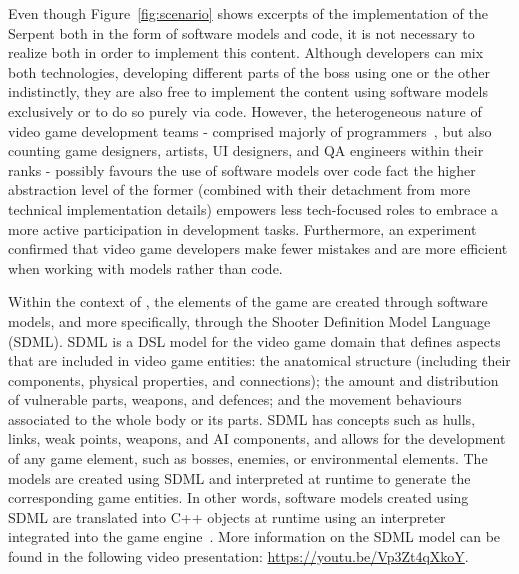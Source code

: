 Even though Figure~\ref{fig:scenario} shows excerpts of the implementation of the Serpent both in the form of software models and code, it is not necessary to realize both in order to implement this content. Although developers can mix both technologies, developing different parts of the boss using one or the other indistinctly, they are also free to implement the content using software models exclusively or to do so purely via code. However, the heterogeneous nature of video game development teams - comprised majorly of programmers~\cite{devNation}, but also counting game designers, artists, UI designers, and QA engineers within their ranks - possibly favours the use of software models over code fact the higher abstraction level of the former (combined with their detachment from more technical implementation details) empowers less tech-focused roles to embrace a more active participation in development tasks. Furthermore, an experiment~\cite{domingo2020evaluating} confirmed that video game developers make fewer mistakes and are more efficient when working with models rather than code.

Within the context of \CaseStudy{}, the elements of the game are created through software models, and more specifically, through the Shooter Definition Model Language (SDML). SDML is a DSL model for the video game domain that defines aspects that are included in video game entities: the anatomical structure (including their components, physical properties, and connections); the amount and distribution of vulnerable parts, weapons, and defences; and the movement behaviours associated to the whole body or its parts. SDML has concepts such as hulls, links, weak points, weapons, and AI components, and allows for the development of any game element, such as bosses, enemies, or environmental elements. The models are created using SDML and interpreted at runtime to generate the corresponding game entities. In other words, software models created using SDML are translated into C++ objects at runtime using an interpreter integrated into the game engine~\cite{blasco2021evolutionary}. More information on the SDML model can be found in the following video presentation: \url{https://youtu.be/Vp3Zt4qXkoY}.

